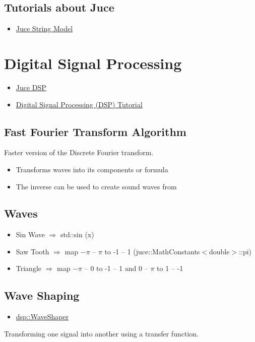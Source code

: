 \documentclass{article}
\begin{document}
	 
	 \subsection{Tutorials about Juce}
	 \begin{itemize}
	 	\item \href{https://docs.juce.com/master/tutorial_dsp_delay_line.html}{Juce String Model}
	 \end{itemize}

\section{Digital Signal Processing}
	\begin{itemize}
		\item \href{https://docs.juce.com/master/tutorial_dsp_introduction.html}{Juce DSP}
		\item \href{https://www.youtube.com/watch?v=HJ_-5mqUZ70}{Digital Signal Processing (DSP) Tutorial}
	\end{itemize}
	
	\subsection{Fast Fourier Transform Algorithm}
	Faster version of the Discrete Fourier transform.
	\begin{itemize}
		\item Transforms waves into its components or formula
		\item The inverse can be used to create sound waves from 
	\end{itemize}
	
	\subsection{Waves}
	\begin{itemize}
		\item Sin Wave $\Rightarrow$ std::sin (x)
		\item Saw Tooth $\Rightarrow$ map $-\pi$ -- $\pi$ to -1 -- 1 (juce::MathConstants$<$double$>$::pi)
		\item Triangle $\Rightarrow$ map $-\pi$ -- 0 to -1 -- 1 and 0 -- $\pi$ to 1 -- -1
	\end{itemize}
	
	
	\subsection{Wave Shaping}
	\begin{itemize}
		\item \href{https://docs.juce.com/master/structdsp_1_1WaveShaper.html}{dsp::WaveShaper}
	\end{itemize}
	Transforming one signal into another using a transfer function.
\end{document}
